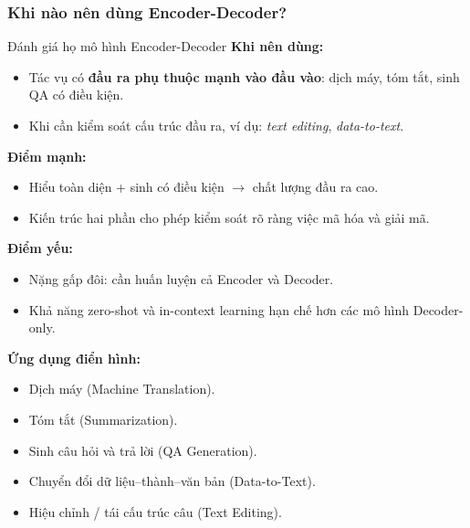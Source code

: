 \subsubsection{Khi nào nên dùng Encoder-Decoder?}
\begin{assess}{Đánh giá họ mô hình Encoder-Decoder}
	\textbf{Khi nên dùng:}
	\begin{itemize}
		\item Tác vụ có \textbf{đầu ra phụ thuộc mạnh vào đầu vào}: dịch máy, tóm tắt, sinh QA có điều kiện.
		\item Khi cần kiểm soát cấu trúc đầu ra, ví dụ: \textit{text editing}, \textit{data-to-text}.
	\end{itemize}
	
	\textbf{Điểm mạnh:}
	\begin{itemize}
		\item Hiểu toàn diện + sinh có điều kiện $\rightarrow$ chất lượng đầu ra cao.  
		\item Kiến trúc hai phần cho phép kiểm soát rõ ràng việc mã hóa và giải mã.
	\end{itemize}
	
	\textbf{Điểm yếu:}
	\begin{itemize}
		\item Nặng gấp đôi: cần huấn luyện cả Encoder và Decoder.  
		\item Khả năng zero-shot và in-context learning hạn chế hơn các mô hình Decoder-only.
	\end{itemize}
	
	\textbf{Ứng dụng điển hình:}
	\begin{itemize}
		\item Dịch máy (Machine Translation).  
		\item Tóm tắt (Summarization).  
		\item Sinh câu hỏi và trả lời (QA Generation).  
		\item Chuyển đổi dữ liệu–thành–văn bản (Data-to-Text).  
		\item Hiệu chỉnh / tái cấu trúc câu (Text Editing).
	\end{itemize}
\end{assess}